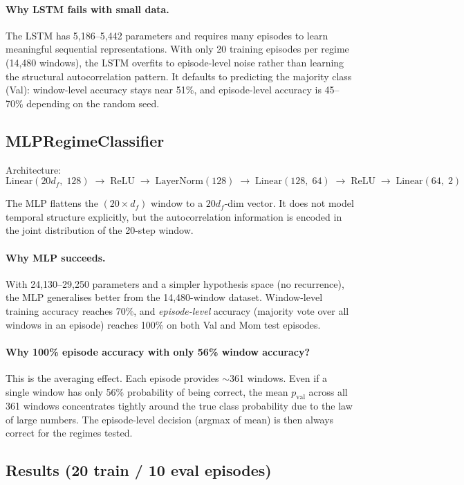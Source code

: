 \documentclass[11pt]{article}
\begin{document}
\paragraph{Why LSTM fails with small data.}
The LSTM has 5,186--5,442 parameters and requires many episodes to learn
meaningful sequential representations.  With only 20 training episodes per
regime (14,480 windows), the LSTM overfits to episode-level noise rather
than learning the structural autocorrelation pattern.  It defaults to
predicting the majority class (Val): window-level accuracy stays near 51\%,
and episode-level accuracy is 45--70\% depending on the random seed.

\subsection{MLPRegimeClassifier}

Architecture:
\[
\text{Linear}(20 d_f,\; 128) \;\to\; \text{ReLU} \;\to\; \text{LayerNorm}(128)
\;\to\; \text{Linear}(128,\; 64) \;\to\; \text{ReLU} \;\to\; \text{Linear}(64,\; 2)
\]

The MLP flattens the $(20 \times d_f)$ window to a $20 d_f$-dim vector.
It does not model temporal structure explicitly, but the autocorrelation
information is encoded in the joint distribution of the 20-step window.

\paragraph{Why MLP succeeds.}
With 24,130--29,250 parameters and a simpler hypothesis space (no recurrence),
the MLP generalises better from the 14,480-window dataset.  Window-level
training accuracy reaches 70\%, and \emph{episode-level} accuracy (majority
vote over all windows in an episode) reaches 100\% on both Val and Mom test
episodes.

\paragraph{Why 100\% episode accuracy with only 56\% window accuracy?}
This is the averaging effect.  Each episode provides $\sim$361 windows.  Even
if a single window has only 56\% probability of being correct, the mean
$p_\text{val}$ across all 361 windows concentrates tightly around the true
class probability due to the law of large numbers.  The episode-level
decision (argmax of mean) is then always correct for the regimes tested.

\subsection{Results (20 train / 10 eval episodes)}
\end{document}
